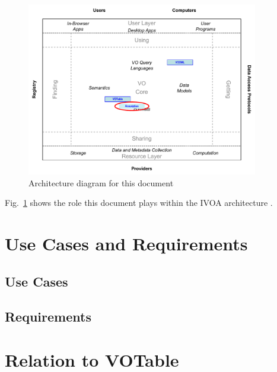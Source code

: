 \documentclass[11pt,a4paper]{ivoa}
\begin{document}
\begin{figure}[h]
\centering


\includegraphics[width=0.9\textwidth]{role_diagram.pdf}
\caption{Architecture diagram for this document}
\label{fig:archdiag}
\end{figure}

Fig.~\ref{fig:archdiag} shows the role this document plays within
the IVOA architecture \citep{2010ivoa.rept.1123A}.


\pagebreak
\section{Use Cases and Requirements}

\subsection{Use Cases}



\subsection{Requirements}



\lstset{language=XML}

\pagebreak
\section{Relation to VOTable}
\end{document}
